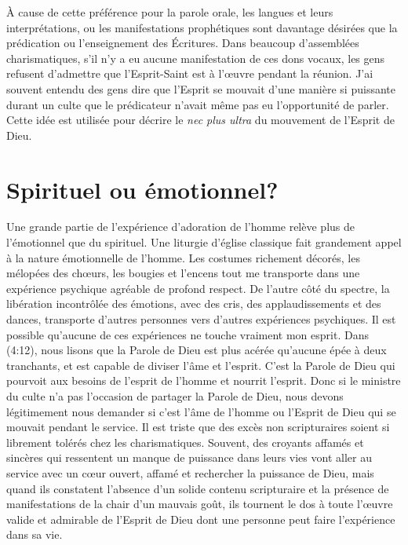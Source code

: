 À cause de cette préférence pour la parole orale, les langues
 et leurs interprétations, ou les manifestations prophétiques
 sont davantage désirées que la prédication ou l'enseignement des Écritures.
 Dans beaucoup d'assemblées charismatiques, s'il n'y a eu aucune
 manifestation de ces dons vocaux, les gens refusent d'admettre que
 l'Esprit-Saint est à l'œuvre pendant la réunion.
 J'ai souvent entendu des gens dire que l'Esprit se mouvait d'une manière
 si puissante durant un culte que le prédicateur n'avait même pas eu
 l'opportunité de parler. Cette idée est utilisée pour décrire le
 \emph{nec plus ultra} du mouvement de l'Esprit de Dieu.


\section{Spirituel ou \'emotionnel?}

Une grande partie de l'expérience d'adoration de l'homme relève plus
 de l'émotionnel que du spirituel.
 Une liturgie d'église classique fait grandement appel à la nature émotionnelle de l'homme.
 Les costumes richement décorés, les mélopées des chœurs, les bougies et l'encens
 \ocadr tout me transporte dans une expérience psychique agréable
 de profond respect. De l'autre côté du spectre, la libération incontrôlée
 des émotions, avec des cris, des applaudissements et des dances,
 transporte d'autres personnes vers d'autres expériences psychiques.
 Il est possible qu'aucune de ces expériences ne touche vraiment mon esprit.
 Dans (4:12), nous lisons que la Parole de Dieu
 est plus acérée qu'aucune épée à deux tranchants,
 et est capable de diviser l'âme et l'esprit.
 C'est la Parole de Dieu qui pourvoit aux besoins de l'esprit de l'homme
 et nourrit l'esprit. Donc si le ministre du culte n'a pas l'occasion
 de partager la Parole de Dieu, nous devons légitimement nous demander
 si c'est l'âme de l'homme ou l'Esprit de Dieu qui se mouvait pendant
 le service. Il est triste que des excès non scripturaires soient si
 librement tolérés chez les charismatiques.
 Souvent, des croyants affamés et sincères qui ressentent un manque
 de puissance dans leurs vies vont aller au service avec un cœur ouvert,
 affamé et rechercher la puissance de Dieu, mais quand ils constatent
 l'absence d'un solide contenu scripturaire et la présence
 de manifestations de la chair d'un mauvais goût, ils tournent le dos
 à toute l'œuvre valide et admirable de l'Esprit de Dieu dont une personne
 peut faire l'expérience dans sa vie.


